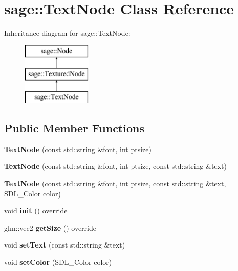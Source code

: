 \hypertarget{classsage_1_1TextNode}{}\section{sage\+::Text\+Node Class Reference}
\label{classsage_1_1TextNode}
Inheritance diagram for sage\+::Text\+Node\+:\begin{figure}[H]
\begin{center}
\leavevmode
\includegraphics[height=3.000000cm]{classsage_1_1TextNode}
\end{center}
\end{figure}
\subsection*{Public Member Functions}
\begin{DoxyCompactItemize}
\item 
\mbox{\label{classsage_1_1TextNode_a5fbde25db3407b5e5e84ef297821dec6}} 
{\bfseries Text\+Node} (const std\+::string \&font, int ptsize)
\item 
\mbox{\label{classsage_1_1TextNode_a9988fa03958e378b3fd612ea3a103649}} 
{\bfseries Text\+Node} (const std\+::string \&font, int ptsize, const std\+::string \&text)
\item 
\mbox{\label{classsage_1_1TextNode_a5677717ec6c2db9e311a40ad1510adb9}} 
{\bfseries Text\+Node} (const std\+::string \&font, int ptsize, const std\+::string \&text, S\+D\+L\+\_\+\+Color color)
\item 
\mbox{\label{classsage_1_1TextNode_ae389b7b4afae4d068ac29686343f279e}} 
void {\bfseries init} () override
\item 
\mbox{\label{classsage_1_1TextNode_ac5aa86ad68f3470c50f7021695a6c45d}} 
glm\+::vec2 {\bfseries get\+Size} () override
\item 
\mbox{\label{classsage_1_1TextNode_a81f9aa6c3c25d5b2b53904becad654fe}} 
void {\bfseries set\+Text} (const std\+::string \&text)
\item 
\mbox{\label{classsage_1_1TextNode_a46a1738c681f158ab1d2468d3ec02a24}} 
void {\bfseries set\+Color} (S\+D\+L\+\_\+\+Color color)
\end{DoxyCompactItemize}
